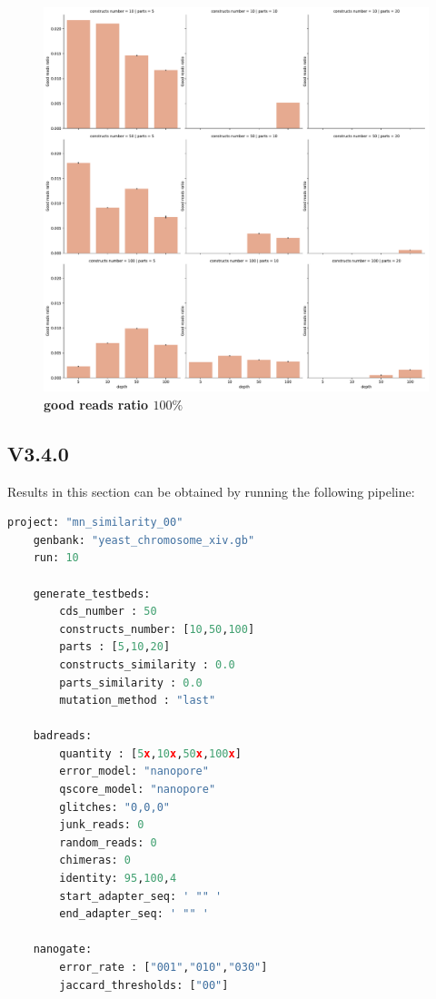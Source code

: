 \documentclass[11pt, a4paper]{article}
\begin{document}
\begin{figure}[ht]
    \begin{center}
    \includegraphics[width=1\textwidth]{../results/images_notebook/v_322/100_good_reads_ratio.pdf}
    \end{center}
    \caption{{\bf good reads ratio $100\%$}}
   \label{fig:v_322_good_reads__ratio_100}
\end{figure}

\clearpage
\subsection{V3.4.0 }
Results in this section can be obtained by running the following pipeline:
\begin{lstlisting}[language=Python]
    project: "mn_similarity_00"
    genbank: "yeast_chromosome_xiv.gb"
    run: 10

    generate_testbeds:
        cds_number : 50
        constructs_number: [10,50,100]
        parts : [5,10,20]
        constructs_similarity : 0.0
        parts_similarity : 0.0
        mutation_method : "last"

    badreads:
        quantity : [5x,10x,50x,100x]
        error_model: "nanopore"
        qscore_model: "nanopore"
        glitches: "0,0,0"
        junk_reads: 0
        random_reads: 0
        chimeras: 0
        identity: 95,100,4
        start_adapter_seq: ' "" '
        end_adapter_seq: ' "" '

    nanogate:
        error_rate : ["001","010","030"]
        jaccard_thresholds: ["00"]
\end{lstlisting}
\clearpage
\end{document}

